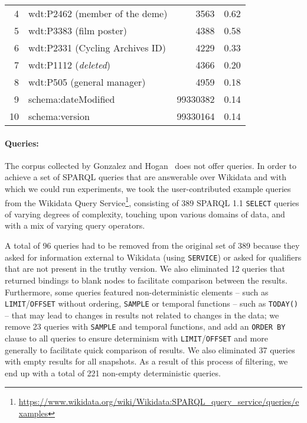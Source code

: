 \documentclass[runningheads]{llncs}
\begin{document}
\begin{table}[!t]
{\begin{tabular}{r@{\hskip 0.1in}lr@{\hskip 0.1in}r}
			4 & wdt:P2462 (member of the deme) & 3563 & 0.62	\\
			5 & wdt:P3383 (film poster) & 4388 & 0.58	\\
			6 & wdt:P2331 (Cycling Archives ID) & 4229 & 0.33	\\
			7 & wdt:P1112 (\textit{deleted}) & 4366 & 0.20	\\
			8 & wdt:P505 (general manager) & 4959 & 0.18	\\
			9 & schema:dateModified & 99330382 & 0.14	\\
			10 & schema:version & 99330164 & 0.14	\\    \bottomrule
		\end{tabular}	
	}	
\end{table}


\paragraph{Queries:} The corpus collected by Gonzalez and Hogan~\cite{GonzalezH18} does not offer queries. In order to achieve a set of SPARQL queries that are answerable over Wikidata and with which we could run experiments, we took the user-contributed example queries from the Wikidata Query Service\footnote{\url{https://www.wikidata.org/wiki/Wikidata:SPARQL_query_service/queries/examples}}, consisting of 389 SPARQL 1.1 \texttt{SELECT} queries of varying degrees of complexity, touching upon various domains of data, and with a mix of varying query operators. %

A total of 96 queries had to be removed from the original set of 389 because they asked for information external to Wikidata (using \texttt{SERVICE}) or asked for qualifiers that are not present in the truthy version. We also eliminated 12 queries that returned bindings to blank nodes to facilitate comparison between the results. Furthermore, some queries featured non-deterministic elements -- such as \texttt{LIMIT}/\texttt{OFFSET} without ordering, \texttt{SAMPLE} or temporal functions -- such as \texttt{TODAY()} -- that may lead to changes in results not related to changes in the data; we remove 23 queries with \texttt{SAMPLE} and temporal functions, and add an \texttt{ORDER BY} clause to all queries to ensure determinism with \texttt{LIMIT}/\texttt{OFFSET} and more generally to facilitate quick comparison of results. We also eliminated 37 queries with empty results for all snapshots. As a result of this process of filtering, we end up with a total of 221 non-empty deterministic queries.
\end{document}
